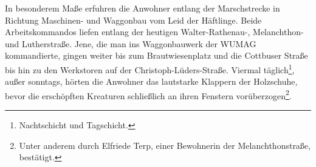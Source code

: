 \documentclass[a4paper,12pt,ngerman,
]{nisebook}
\begin{document}

In besonderem Maße erfuhren die Anwohner entlang der Marschstrecke in Richtung Maschinen- und Waggonbau vom Leid der Häftlinge. Beide Arbeitskommandos liefen entlang der heutigen Walter-Rathenau-, Melanchthon- und Lutherstraße. Jene, die man ins Waggonbauwerk der WUMAG kommandierte, gingen weiter bis zum Brautwiesenplatz und die Cottbuser Straße bis hin zu den Werkstoren auf der Christoph-Lüders-Straße. Viermal täglich\footnote{Nachtschicht und Tagschicht.}, außer sonntags, hörten die Anwohner das lautstarke Klappern der Holzschuhe, bevor die erschöpften Kreaturen schließlich an ihren Fenstern vorüberzogen\footnote{Unter anderem durch Elfriede Terp, einer Bewohnerin der Melanchthonstraße, bestätigt.}.

\end{document}
